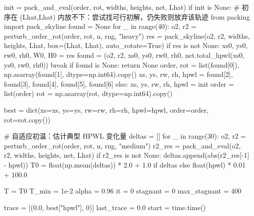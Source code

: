 \documentclass{JXUSTmodeling}
\begin{document}
\begin{appendixx}
\begin{python}
    init = pack_and_eval(order, rot, widths, heights, net, Lhat)
    if init is None:
        # 初序在 (Lhat,Lhat) 内放不下：尝试找可行初解，仍失败则放弃该轨迹
        from packing import pack_skyline
        found = None
        for _ in range(40):
            o2, r2 = perturb_order_rot(order, rot, n, rng, "heavy")
            res = pack_skyline(o2, r2, widths, heights, Lhat,
                               box=(Lhat, Lhat), auto_rotate=True)
            if res is not None:
                xs0, ys0, rw0, rh0, W0, H0 = res
                found = (o2, r2, xs0, ys0, rw0, rh0,
                         net.total_hpwl(xs0, ys0, rw0, rh0))
                break
        if found is None:
            return None
        order, rot = list(found[0]), np.asarray(found[1], dtype=np.int64).copy()
        xs, ys, rw, rh, hpwl = found[2], found[3], found[4], found[5], found[6]
    else:
        xs, ys, rw, rh, hpwl = init
        order = list(order)
        rot = np.asarray(rot, dtype=np.int64).copy()

    best = dict(xs=xs, ys=ys, rw=rw, rh=rh, hpwl=hpwl,
                order=order, rot=rot.copy())

    # 自适应初温：估计典型 HPWL 变化量
    deltas = []
    for _ in range(30):
        o2, r2 = perturb_order_rot(order, rot, n, rng, "medium")
        r2_res = pack_and_eval(o2, r2, widths, heights, net, Lhat)
        if r2_res is not None:
            deltas.append(abs(r2_res[-1] - hpwl))
    T0 = float(np.mean(deltas)) * 2.0 + 1.0 if deltas else float(hpwl) * 0.01 + 100.0

    T = T0
    T_min = 1e-2
    alpha = 0.96
    it = 0
    stagnant = 0
    max_stagnant = 400

    trace = [(0.0, best["hpwl"], 0)]
    last_trace = 0.0
    start = time.time()


\end{python}
\end{appendixx}
\end{document}
